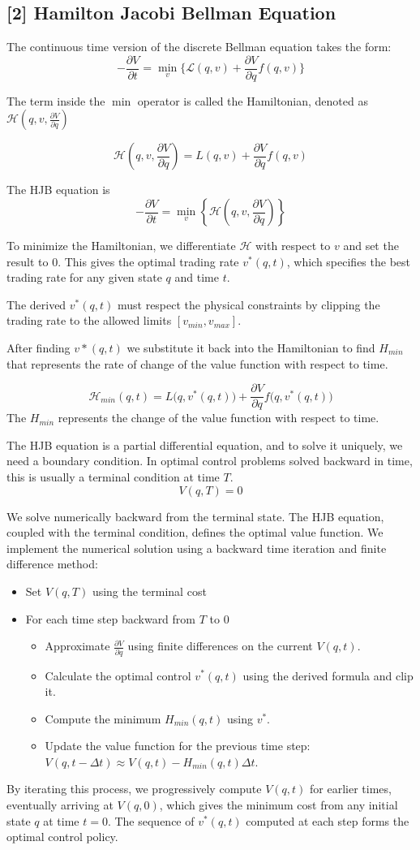\subsection*{[2] Hamilton Jacobi Bellman Equation}
The continuous time version of the discrete Bellman equation takes the form:
$$-\frac{\partial V}{\partial t} = \min_v \bigg\{ \mathcal{L}(q,v) + \frac{\partial V}{\partial q} f(q,v) \bigg\}$$

The term inside the $\min$ operator is called the Hamiltonian, denoted as $\mathcal{H}(q,v,\frac{\partial V}{\partial q})$

$$\mathcal{H}\left(q,v,\frac{\partial V}{\partial q} \right) = L(q,v) + \frac{\partial V}{\partial q} f(q,v)$$

The HJB equation is
$$-\frac{\partial V}{\partial t} = \min_v\left\{ \mathcal{H} \left(q,v, \frac{\partial V}{\partial q}\right) \right\}$$

To minimize the Hamiltonian, we differentiate $\mathcal{H}$ with respect to $v$ and set the result to $0$. This gives the optimal trading rate $v^*(q,t)$, which specifies the best trading rate for any given state $q$ and time $t$.

The derived $v^*(q,t)$ must respect the physical constraints by clipping the trading rate to the allowed limits $[v_{min}, v_{max}]$.

After finding $v*(q,t)$ we substitute it back into the Hamiltonian to find $H_{min}$ that represents the rate of change of the value function with respect to time.

$$\mathcal{H}_{min}(q,t) = L\big(q, v^*(q,t)\big) + \frac{\partial V}{\partial q} f\big(q, v^*(q,t)\big)$$
The $H_{min}$ represents the change of the value function with respect to time.

The HJB equation is a partial differential equation, and to solve it uniquely, we need a boundary condition. In optimal control problems solved backward in time, this is usually a terminal condition at time $T$.
$$V(q,T) = 0$$

We solve numerically backward from the terminal state. The HJB equation, coupled with the terminal condition, defines the optimal value function. We implement the numerical solution using a backward time iteration and finite difference method:

\begin{itemize}
\item Set $V(q, T)$ using the terminal cost
\item For each time step backward from $T$ to $0$
\begin{itemize}
\item Approximate $\frac{\partial V}{\partial q}$ using finite differences on the current 
$V(q, t)$.
\item Calculate the optimal control 
$v^*(q, t)$ using the derived formula and clip it.
\item Compute the minimum $H_{min}(q, t)$ using $v^*$.
\item Update the value function for the previous time step: 
$V(q, t - \Delta t) \approx V(q, t) - H_{min}(q, t) \Delta t$.
\end{itemize}
\end{itemize}

By iterating this process, we progressively compute 
$V(q, t)$ for earlier times, eventually arriving at 
$V(q, 0)$, which gives the minimum cost from any initial state $q$ at time $t=0$. The sequence of 
$v^*(q, t)$ computed at each step forms the optimal control policy.